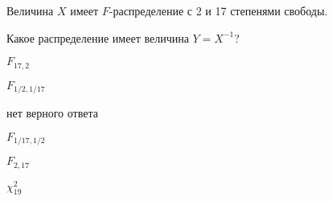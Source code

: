 
\begin{question}
Величина \(X\) имеет \(F\)-распределение с 2 и 17 степенями свободы.

Какое распределение имеет величина \(Y = X^{-1}\)?
\begin{answerlist}
  \item \(F_{17, 2}\)
  \item \(F_{1/2, 1/17}\)
  \item нет верного ответа
  \item \(F_{1/17, 1/2}\)
  \item \(F_{2, 17}\)
  \item \(\chi^2_{19}\)
\end{answerlist}
\end{question}


